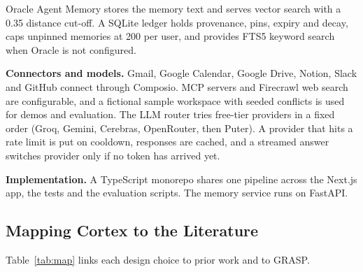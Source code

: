 \documentclass[conference]{IEEEtran}
\begin{document}
Oracle Agent Memory stores the memory text and serves vector search with a 0.35 distance cut-off. A SQLite ledger holds provenance, pins, expiry and decay, caps unpinned memories at 200 per user, and provides FTS5 keyword search when Oracle is not configured.

\textbf{Connectors and models.} Gmail, Google Calendar, Google Drive, Notion, Slack and GitHub connect through Composio. MCP servers and Firecrawl web search are configurable, and a fictional sample workspace with seeded conflicts is used for demos and evaluation. The LLM router tries free-tier providers in a fixed order (Groq, Gemini, Cerebras, OpenRouter, then Puter). A provider that hits a rate limit is put on cooldown, responses are cached, and a streamed answer switches provider only if no token has arrived yet.

\textbf{Implementation.} A TypeScript monorepo shares one pipeline across the Next.js app, the tests and the evaluation scripts. The memory service runs on FastAPI.

\subsection{Mapping Cortex to the Literature}
Table~\ref{tab:map} links each design choice to prior work and to GRASP.
\end{document}
